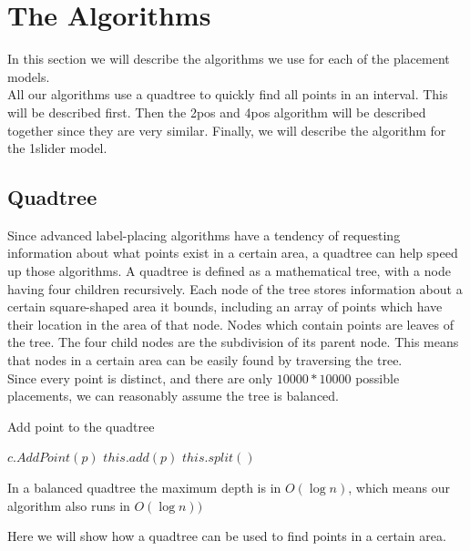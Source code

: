 \documentclass[crop=false,a4paper,oneside,11pt]{article}
\begin{document}
\section{The Algorithms}
In this section we will describe the algorithms we use for each of the placement models.\\
All our algorithms use a quadtree to quickly find all points in an interval. This will be described first. Then the 2pos and 4pos algorithm will be described together since they are very similar. Finally, we will describe the algorithm for the 1slider model.

\subsection{Quadtree}

Since advanced label-placing algorithms have a tendency of requesting information about what points exist in a certain area, a quadtree can help speed up those algorithms. A quadtree is defined as a mathematical tree, with a node having four children recursively. Each node of the tree stores information about a certain square-shaped area it bounds, including an array of points which have their location in the area of that node. Nodes which contain points are leaves of the tree. The four child nodes are the subdivision of its parent node. This means that nodes in a certain area can be easily found by traversing the tree.\\
Since every point is distinct, and there are only $10000 * 10000$ possible placements, we can reasonably assume the tree is balanced.\\
\begin{algorithm}[H]
\caption{Add point to the quadtree}
\begin{algorithmic}[1]
\State $c.AddPoint(p)$
\EndIf
\EndFor
\Else{}
\State $this.add(p)$
\State $this.split()$ 
\EndIf
\EndIf
\EndProcedure
\end{algorithmic}
\end{algorithm}
In a balanced quadtree the maximum depth is in $O(\log{n})$, which means our algorithm also runs in $O(\log{n}))$

Here we will show how a quadtree can be used to find points in a certain area.\\
\end{document}
